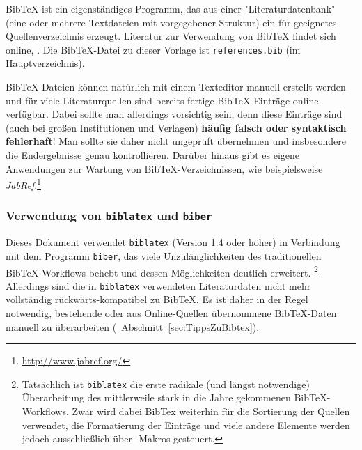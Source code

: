 BibTeX ist ein eigenständiges Programm, das aus einer "Literaturdatenbank" (eine oder mehrere
Textdateien mit vorgegebener Struktur) ein für \latex geeignetes Quellenverzeichnis
erzeugt. Literatur zur Verwendung von BibTeX findet sich online, \zB \cite{Feder2006, Patashnik1988}.
Die BibTeX-Datei zu dieser Vorlage ist \nolinkurl{references.bib} (im Hauptverzeichnis).

BibTeX-Dateien können natürlich mit einem Texteditor manuell erstellt werden und für
viele Literaturquellen sind bereits fertige BibTeX-Einträge online verfügbar.
Dabei sollte man allerdings vorsichtig sein, denn diese Einträge sind (auch bei großen
Institutionen und Verlagen) \textbf{häufig falsch oder syntaktisch fehlerhaft}!
Man sollte sie daher nicht ungeprüft übernehmen und insbesondere die Endergebnisse genau kontrollieren.
Darüber hinaus gibt es eigene Anwendungen zur Wartung von
BibTeX-Verzeichnissen, wie beispielsweise
\emph{JabRef}.\footnote{\url{http://www.jabref.org/}}


\subsubsection{Verwendung von \texttt{biblatex} und \texttt{biber}}

Dieses Dokument verwendet \texttt{biblatex} (Version 1.4 oder höher) in Verbindung
mit dem Programm \texttt{biber}, 
das viele Unzulänglichkeiten des traditionellen BibTeX-Work\-flows behebt und dessen Möglichkeiten deutlich erweitert.%
\footnote{Tatsächlich ist \texttt{biblatex} die erste radikale (und längst notwendige) Überarbeitung des mittlerweile stark in die Jahre gekommenen BibTeX-Workflows. Zwar wird dabei BibTex weiterhin für 
die Sortierung der Quellen verwendet, die Formatierung der Einträge und viele andere Elemente werden jedoch ausschließlich über \latex-Makros gesteuert.}
Allerdings sind die in \texttt{biblatex} verwendeten Literaturdaten nicht mehr vollständig 
rückwärts-kompatibel zu BibTeX. Es ist daher in der Regel notwendig, bestehende oder aus
Online-Quellen übernommene BibTeX-Daten manuell zu überarbeiten (\sa\ Abschnitt~\ref{sec:TippsZuBibtex}).

